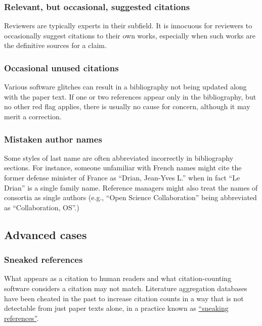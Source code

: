 \documentclass[letterpaper, 12pt]{article}
\begin{document}
\subsubsection*{Relevant, but occasional, suggested citations}

Reviewers are typically experts in their subfield. It is innocuous for reviewers to occasionally suggest citations to their own works, especially when such works are the definitive sources for a claim.

\subsubsection*{Occasional unused citations}

Various software glitches can result in a bibliography not being updated along with the paper text.
If one or two references appear only in the bibliography, but no other red flag applies, there is usually no cause for concern, although it may merit a correction.

\subsubsection*{Mistaken author names}

Some styles of last name are often abbreviated incorrectly in bibliography sections.
For instance, someone unfamiliar with French names might cite the former defense minister of France as ``Drian, Jean-Yves L.''
when in fact ``Le Drian'' is a single family name. Reference managers might also treat the names of consortia as single authors (e.g., ``Open Science Collaboration'' being abbreviated as ``Collaboration, OS''.)

\subsection*{Advanced cases}

\subsubsection*{Sneaked references}

What appears as a citation to human readers and what citation-counting software considers a citation may not match.
Literature aggregation databases have been cheated in the past to increase citation counts in a way that is not detectable from just paper texts alone, in a practice known as \href{https://doi.org/10.1002/asi.24896}{``sneaking references''}.
\end{document}
